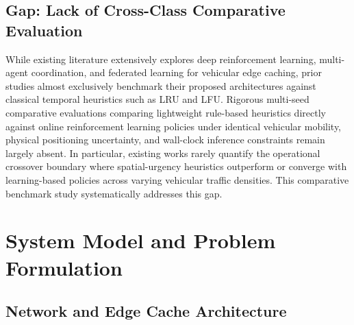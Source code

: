 \documentclass[preprint,12pt]{elsarticle}
\begin{document}
	\subsection{Gap: Lack of Cross-Class Comparative Evaluation}
	\begin{hlblock}
	While existing literature extensively explores deep reinforcement learning, multi-agent coordination, and federated learning for vehicular edge caching, prior studies almost exclusively benchmark their proposed architectures against classical temporal heuristics such as LRU and LFU. Rigorous multi-seed comparative evaluations comparing lightweight rule-based heuristics directly against online reinforcement learning policies under identical vehicular mobility, physical positioning uncertainty, and wall-clock inference constraints remain largely absent. In particular, existing works rarely quantify the operational crossover boundary where spatial-urgency heuristics outperform or converge with learning-based policies across varying vehicular traffic densities. This comparative benchmark study systematically addresses this gap.
	\end{hlblock}

	\section{System Model and Problem Formulation}
	\label{sec:system_model}
	
	\subsection{Network and Edge Cache Architecture}
	
\end{document}
